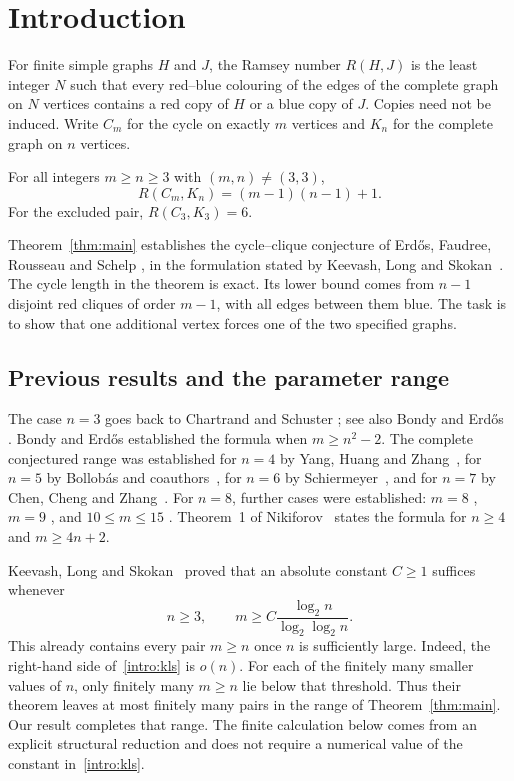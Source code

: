 \section{Introduction}
\label{sec:introduction}

For finite simple graphs $H$ and $J$, the Ramsey number $R(H,J)$ is the
least integer $N$ such that every red--blue colouring of the edges of the
complete graph on $N$ vertices contains a red copy of $H$ or a blue copy of
$J$. Copies need not be induced. Write $C_m$ for the cycle on exactly $m$
vertices and $K_n$ for the complete graph on $n$ vertices.

\begin{theorem}\label{thm:main}
For all integers $m\ge n\ge3$ with $(m,n)\ne(3,3)$,
\[
 R(C_m,K_n)=(m-1)(n-1)+1.
\]
For the excluded pair, $R(C_3,K_3)=6$.
\end{theorem}

Theorem~\ref{thm:main} establishes the cycle--clique conjecture of
Erd\H{o}s, Faudree, Rousseau and Schelp
\cite{ErdosFaudreeRousseauSchelp1978}, in the formulation stated by
Keevash, Long and Skokan~\cite{KeevashLongSkokan2021}.
The cycle length in the theorem is exact. Its lower bound comes from
$n-1$ disjoint red cliques of order $m-1$, with all edges between them blue.
The task is to show that one additional vertex forces one of the two
specified graphs.

\subsection{Previous results and the parameter range}

The case $n=3$ goes back to Chartrand and Schuster
\cite{ChartrandSchuster1971}; see also Bondy and Erd\H{o}s
\cite[p.~47]{BondyErdos1973}. Bondy and Erd\H{o}s
\cite[Theorem~4]{BondyErdos1973} established the formula when
$m\ge n^2-2$. The complete conjectured range was established for $n=4$
by Yang, Huang and Zhang~\cite{YangHuangZhang1999}, for $n=5$ by
Bollob\'as and coauthors~\cite{BollobasEtAl2000}, for $n=6$ by
Schiermeyer~\cite{Schiermeyer2003}, and for $n=7$ by Chen, Cheng and
Zhang~\cite{ChenChengZhang2008}.
For $n=8$, further cases were established: $m=8$
\cite{JaradatAlzaleq2007,ZhangZhang2009}, $m=9$
\cite{BatainehJaradatAlZaleq2011}, and $10\le m\le15$
\cite{Baniabedalruhman2023}.
Theorem~1 of Nikiforov~\cite{Nikiforov2005} states the formula for
$n\ge4$ and $m\ge4n+2$.

Keevash, Long and Skokan~\cite[Theorem~1.1]{KeevashLongSkokan2021}
proved that an absolute constant $C\ge1$ suffices whenever
\begin{equation}\label{intro:kls}
 n\ge3,\qquad
 m\ge C\frac{\log_2 n}{\log_2\log_2 n}.
\end{equation}
This already contains every pair $m\ge n$ once $n$ is sufficiently large.
Indeed, the right-hand side of~\eqref{intro:kls} is $o(n)$.
For each of the finitely many smaller values of $n$, only finitely many
$m\ge n$ lie below that threshold. Thus their theorem leaves at most
finitely many pairs in the range of Theorem~\ref{thm:main}.
Our result completes that range. The finite calculation below comes from
an explicit structural reduction and does not require a numerical value
of the constant in~\eqref{intro:kls}.

